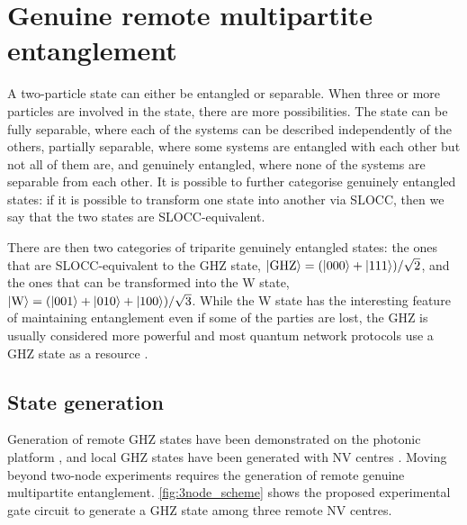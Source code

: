 \documentclass[a4paper]{article}
\begin{document}
\section{Genuine remote multipartite entanglement}
\label{sec:multipartite}
A two-particle state can either be entangled or separable. When three or more particles are involved in the state, there are more possibilities. The state can be fully separable, where each of the systems can be described independently of the others, partially separable, where some systems are entangled with each other but not all of them are, and genuinely entangled, where none of the systems are separable from each other.
It is possible to further categorise genuinely entangled states: if it is possible to transform one state into another via \ac{SLOCC}, then we say that the two states are \ac{SLOCC}-equivalent.

There are then two categories of triparite genuinely entangled states: the ones that are \ac{SLOCC}-equivalent to the \ac{GHZ} state, $\ket{\text{GHZ}} = (\ket{000} + \ket{111})/\sqrt 2 $, and the ones that can be transformed into the W state, $\ket{\text{W}} = (\ket{001} + \ket{010} + \ket{100})/\sqrt 3 $. While the W state has the interesting feature of maintaining entanglement even if some of the parties are lost, the \ac{GHZ} is usually considered more powerful and most quantum network protocols use a GHZ state as a resource \cite{Guehne2009}. 

\subsection{State generation}

Generation of remote GHZ states have been demonstrated on the photonic platform \cite{Bouwmeester1999}, and local GHZ states have been generated with \ac{NV} centres \cite{Neumann2008, vanDam2018}. Moving beyond two-node experiments requires the generation of remote genuine multipartite entanglement. \autoref{fig:3node_scheme} shows the proposed experimental gate circuit to generate a GHZ state among three remote \ac{NV} centres.
\end{document}
